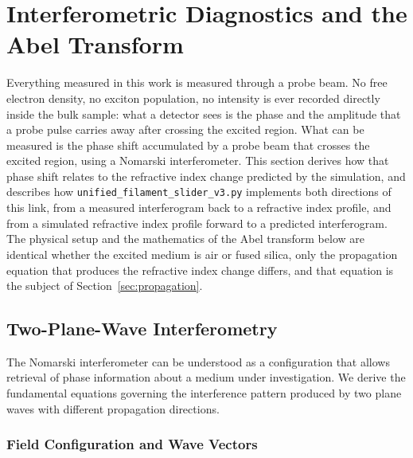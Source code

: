 \section{Interferometric Diagnostics and the Abel Transform}
\label{sec:interferometry}

Everything measured in this work is measured through a probe beam. No free electron density, no exciton population, no intensity is ever recorded directly inside the bulk sample: what a detector sees is the phase and the amplitude that a probe pulse carries away after crossing the excited region. What can be measured is the phase shift accumulated by a probe beam that crosses the excited region, using a Nomarski interferometer. This section derives how that phase shift relates to the refractive index change predicted by the simulation, and describes how \texttt{unified\_filament\_slider\_v3.py} implements both directions of this link, from a measured interferogram back to a refractive index profile, and from a simulated refractive index profile forward to a predicted interferogram. The physical setup and the mathematics of the Abel transform below are identical whether the excited medium is air or fused silica, only the propagation equation that produces the refractive index change differs, and that equation is the subject of Section~\ref{sec:propagation}.

\subsection{Two-Plane-Wave Interferometry}

The Nomarski interferometer can be understood as a configuration that allows retrieval of phase information about a medium under investigation. We derive the fundamental equations governing the interference pattern produced by two plane waves with different propagation directions.

\subsubsection{Field Configuration and Wave Vectors}

